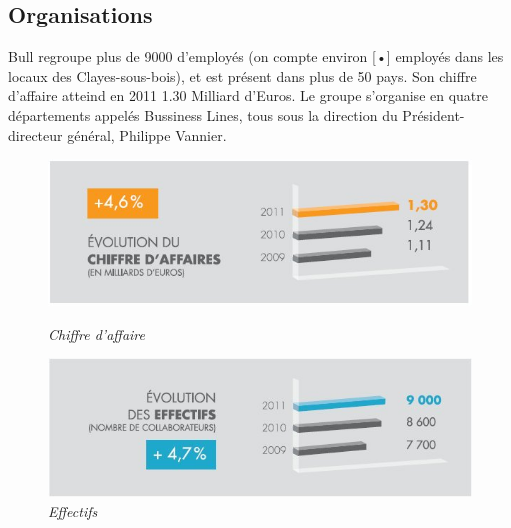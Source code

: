\documentclass[11pt]{article}
\begin{document}
		\subsection{Organisations}
		Bull regroupe plus de 9000 d’employés (on compte environ [•] employés dans les locaux des Clayes-sous-bois), et est 
		présent dans plus de 50 pays. Son chiffre d'affaire atteind en 2011 1.30 Milliard d'Euros. Le groupe s'organise en 
		quatre départements appelés Bussiness Lines, tous sous la direction du Président-directeur général, Philippe Vannier.
		\begin{figure}[h!]
		\begin{minipage}[b]{0.5\linewidth}
		\centering \includegraphics[scale=0.5]{profil2012_ca_fr.jpg}
		\caption{\it Chiffre d'affaire}
		\end{minipage}\hfill
		\begin{minipage}[b]{0.5\linewidth}
		\centering \includegraphics[scale=0.5]{profil2012_effectifs_fr.jpg}
		\caption{\it Effectifs}
		\end{minipage}
		\end{figure}
\end{document}
